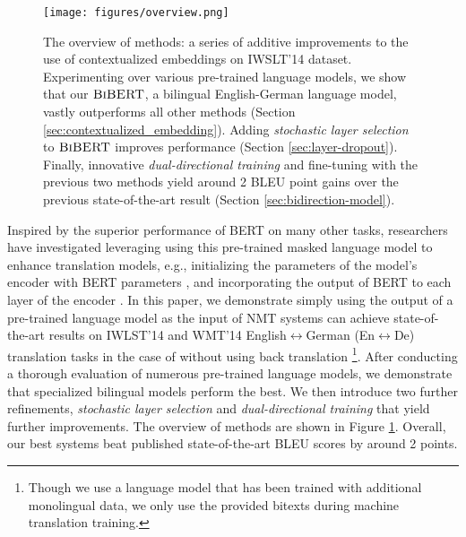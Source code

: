 \documentclass[11pt]{article}
\begin{document}
\begin{figure}[ht]
    \centering
    \texttt{[image: figures/overview.png]}
    \caption{The overview of methods: a series of additive improvements to the use of contextualized embeddings on IWSLT'14 dataset. Experimenting over various pre-trained language models, we show that our $\textsc{BiBERT}$, a bilingual English-German language model, vastly outperforms all other methods (Section \ref{sec:contextualized_embedding}). Adding \emph{stochastic layer selection} to $\textsc{BiBERT}$ improves performance (Section \ref{sec:layer-dropout}). Finally, innovative \emph{dual-directional training} and fine-tuning with the previous two methods yield around 2 BLEU point gains over the previous state-of-the-art result \citep{wu-etal-2021-unidrop} (Section \ref{sec:bidirection-model}).}
    \label{fig:intro}
\end{figure}

Inspired by the superior performance of \textsc{BERT} on many other tasks, researchers have investigated leveraging using this pre-trained masked language model to enhance translation models, e.g., initializing the parameters of the model's encoder with \textsc{BERT} parameters \citep{rothe-etal-2020-leveraging}, and incorporating the output of \textsc{BERT} to each layer of the encoder \citep{Zhu2020Incorporating, weng2020acquiring}. In this paper, we demonstrate simply using the output of a pre-trained language model as the input of NMT systems can achieve state-of-the-art results on IWLST'14 \citep{cettolo2014report} and WMT'14 \citep{bojar2014findings} English$\leftrightarrow$German (En$\leftrightarrow$De) translation tasks in the case of without using back translation \citep{sennrich2016improving,edunov2018understanding}\footnote{Though we use a language model that has been trained with additional monolingual data, we only use the provided bitexts during machine translation training.}. After conducting a thorough evaluation of numerous pre-trained language models, we demonstrate that specialized bilingual models perform the best. We then introduce two further refinements,  \emph{stochastic layer selection} and \emph{dual-directional training} that yield further improvements. The overview of methods are shown in Figure \ref{fig:intro}. Overall, our best systems beat published state-of-the-art BLEU scores by around 2 points.
\end{document}
